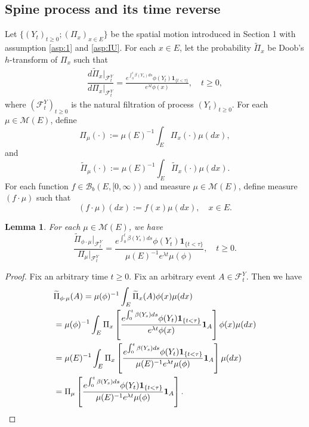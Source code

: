 \documentclass[12pt,a4paper]{amsart}
\numberwithin{equation}{section}
\theoremstyle{plain}
\newtheorem{lem}[thm]{Lemma}
\theoremstyle{definition}
\begin{document}
\subsection{Spine process and its time reverse}
Let $\{(Y_t)_{t\geq 0}; (\Pi_x)_{x\in E}\}$ be the spatial motion introduced in Section 1 with assumption \ref{asp:1} and \ref{asp:IU}.
For each $x\in E$, let the probability $\widetilde \Pi_{x}$ be Doob's $h$-transform of $\Pi_x$ such that
\begin{align}
	\dfrac{d\widetilde{\Pi}_x|_{\mathscr F^Y_t}}{d\Pi_x|_{\mathscr F^Y_t}}= \frac{e^{\int_0^t \beta(Y_s)ds}\phi(Y_t) \mathbf 1_{\{t<\tau\}}}{e^{\lambda t}\phi(x)},
	\quad t\geq 0,
\end{align}
where $(\mathscr F_t^Y)_{t\geq 0}$ is the natural filtration of process $(Y_t)_{t\geq 0}$.
For each $\mu \in \mathcal M(E)$, define
\[
	\Pi_{\mu}(\cdot)
	:= \mu(E)^{-1}\int_{E} \Pi_x(\cdot)\mu(dx),
\]
and
\[
	\widetilde\Pi_{\mu}(\cdot):= \mu(E)^{-1} \int_E\widetilde\Pi_x(\cdot)\mu(dx).
\]
For each function $f \in \mathcal B_b(E,[0,\infty))$ and measure $\mu \in \mathcal M(E)$, define measure $( f \cdot\mu)$ such that
\[
  (f \cdot \mu)(dx)
  := f(x)\mu(dx),
  \quad x\in E.
\]
\begin{lem}
	For each $\mu\in \mathcal M(E)$, we have
 \[
    \dfrac{\widetilde \Pi_{\phi\cdot\mu}|_{\mathscr F_t^Y}}{\Pi_{\mu}|_{\mathscr F_t^Y}}
  	= \frac{e^{\int_0^t \beta(Y_s)ds}\phi(Y_t) \mathbf 1_{\{t<\tau\}}}{\mu(E)^{-1}e^{\lambda t} \mu(\phi)},
  	\quad t\geq 0.
  \]
\end{lem}
\begin{proof}
	Fix an arbitrary time $t\geq 0$. Fix an arbitrary event $A \in \mathscr
  F_t^Y$. Then we have
  \begin{align}
    &\widetilde{\Pi}_{\phi\cdot\mu}(A)
      = \mu(\phi)^{-1} \int_E \widetilde \Pi_x(A)\phi(x)\mu(dx)
    \\&= \mu(\phi)^{-1} \int_E  \Pi_x\left[\frac{e^{\int_0^t \beta(Y_s)ds}\phi(Y_t) \mathbf 1_{\{t<\tau\}}}{e^{\lambda t}\phi(x)} \mathbf 1_A\right]\phi(x)\mu(dx)
    \\&= \mu(E)^{-1}\int_E  \Pi_x\left[\frac{e^{\int_0^t \beta(Y_s)ds}\phi(Y_t) \mathbf 1_{\{t<\tau\}}}{\mu(E)^{-1}e^{\lambda t} \mu(\phi)} \mathbf 1_A\right]\mu(dx)
    \\&= \Pi_{\mu}\left[ \frac{e^{\int_0^t \beta(Y_s)ds}\phi(Y_t) \mathbf 1_{\{t<\tau\}}}{\mu(E)^{-1} e^{\lambda t}\mu(\phi)} \mathbf 1_A \right].
    \qedhere
  \end{align}
\end{proof}
\end{document}
